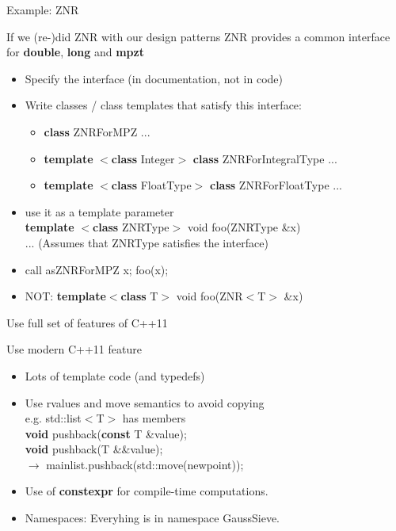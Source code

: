 \documentclass{beamer}
\begin{document}
\begin{frame}{Example: Z\textunderscore NR}
\begin{block}{If we (re-)did Z\textunderscore NR with our design patterns}
Z\textunderscore NR provides a common interface for \textbf{double}, \textbf{long} and \textbf{mpz\textunderscore t}
\begin{itemize}
 \item Specify the interface (in documentation, not in code)
 \item Write classes / class templates that satisfy this interface:
 \begin{itemize}
 \item \textbf{class} Z\textunderscore NRForMPZ ...
 \item \textbf{template} $<$\textbf{class} Integer$>$ \textbf{class} Z\textunderscore NRForIntegralType ...
 \item \textbf{template} $<$\textbf{class} FloatType$>$ \textbf{class} Z\textunderscore NRForFloatType ...
 \end{itemize}
 \item use it as a template parameter\\
 \textbf{template} $<$\textbf{class} ZNRType$>$ void foo(ZNRType \&x)\\
 ... (\alert{Assumes that ZNRType satisfies the interface})
 \item call as\quad Z\textunderscore NRForMPZ x; foo(x);
 \item NOT: \textbf{template}$<$\textbf{class} T$>$ void foo(Z\textunderscore NR$<$T$>$ \&x)
\end{itemize}
\end{block}
\end{frame}

\begin{frame}{Use full set of features of C++11}
\begin{block}{Use modern C++11 feature}
\begin{itemize}
 \item Lots of template code (and typedefs)
 \item Use rvalues and move semantics to avoid copying\\
 e.g. std::list$<$T$>$ has members\\
 \textbf{void} push\textunderscore back(\textbf{const} T \&value);\\
 \textbf{void} push\textunderscore back(T \&\&value);\\
 $\longrightarrow$ main\textunderscore list.push\textunderscore back(std::move(new\textunderscore point));
 \item Use of \textbf{constexpr} for compile-time computations.
 \item Namespaces: Everyhing is in namespace GaussSieve.
\end{itemize}
\end{block}
\end{frame}
\end{document}
